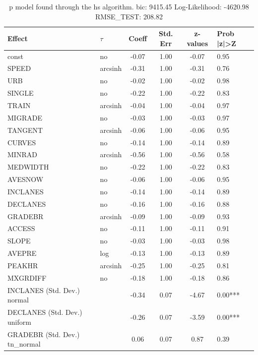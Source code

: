 \begin{table}
	\caption{p model found through the hs algorithm. bic: 9415.45 Log-Likelihood: -4620.98 RMSE_TEST: 208.82}
	\begin{center}
		\begin{tabular}{|l|l|c|c|c|l|}
			\hline
			Effect & $\tau$ & Coeff & Std. Err & z-values & Prob |z|>Z \\
			\hline
			const & no & -0.07 & 1.00 & -0.07 & 0.95 \\
			\hline
			SPEED & arcsinh & -0.31 & 1.00 & -0.31 & 0.76 \\
			\hline
			URB & no & -0.02 & 1.00 & -0.02 & 0.98 \\
			\hline
			SINGLE & no & -0.22 & 1.00 & -0.22 & 0.83 \\
			\hline
			TRAIN & arcsinh & -0.04 & 1.00 & -0.04 & 0.97 \\
			\hline
			MIGRADE & no & -0.03 & 1.00 & -0.03 & 0.97 \\
			\hline
			TANGENT & arcsinh & -0.06 & 1.00 & -0.06 & 0.95 \\
			\hline
			CURVES & no & -0.14 & 1.00 & -0.14 & 0.89 \\
			\hline
			MINRAD & arcsinh & -0.56 & 1.00 & -0.56 & 0.58 \\
			\hline
			MEDWIDTH & no & -0.22 & 1.00 & -0.22 & 0.83 \\
			\hline
			AVESNOW & no & -0.06 & 1.00 & -0.06 & 0.95 \\
			\hline
			INCLANES & no & -0.14 & 1.00 & -0.14 & 0.89 \\
			\hline
			DECLANES & no & -0.16 & 1.00 & -0.16 & 0.88 \\
			\hline
			GRADEBR & arcsinh & -0.09 & 1.00 & -0.09 & 0.93 \\
			\hline
			ACCESS & no & -0.11 & 1.00 & -0.11 & 0.91 \\
			\hline
			SLOPE & no & -0.03 & 1.00 & -0.03 & 0.98 \\
			\hline
			AVEPRE & log & -0.13 & 1.00 & -0.13 & 0.89 \\
			\hline
			PEAKHR & arcsinh & -0.25 & 1.00 & -0.25 & 0.81 \\
			\hline
			MXGRDIFF & no & -0.18 & 1.00 & -0.18 & 0.86 \\
			\hline
			INCLANES (Std. Dev.) normal &  & -0.34 & 0.07 & -4.67 & 0.00*** \\
			\hline
			DECLANES (Std. Dev.) uniform &  & -0.26 & 0.07 & -3.59 & 0.00*** \\
			\hline
			GRADEBR (Std. Dev.) tn_normal &  & 0.06 & 0.07 & 0.87 & 0.39 \\

\end{tabular}
\end{center}
\end{table}
